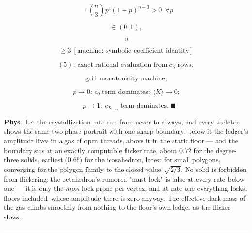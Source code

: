 \begin{theorem}
\[
= \binom n3p^4(1-p)^{n-3}>0\ \ \forall p
\]

\[
\in (0,1),
\]

\[
\ n
\]

\[
\ge 3\ [\text{machine: symbolic coefficient identity}]
\]

\[
(5):\ \text{exact rational evaluation from}\ c_K\ \text{rows};
\]

\[
\ \text{grid monotonicity machine};
\]

\[
\ p\to0:\ c_0\ \text{term dominates}:\ \langle K\rangle\to0;
\]

\[
\quad p\to1:\ c_{K_{\max}}\ \text{term dominates}.\ \blacksquare
\]

\textbf{Phys.} Let the crystallization rate run from never to always, and every skeleton shows the same two-phase portrait with one sharp boundary: below it the ledger's amplitude lives in a gas of open threads, above it in the static floor — and the boundary sits at an exactly computable flicker rate, about $0.72$ for the degree-three solids, earliest ($0.65$) for the icosahedron, latest for small polygons, converging for the polygon family to the closed value $\sqrt{2/3}$. No solid is forbidden from flickering: the octahedron's rumored "must lock" is false at every rate below one — it is only the \textit{most} lock-prone per vertex, and at rate one everything locks, floors included, whose amplitude there is zero anyway. The effective dark mass of the gas climbs smoothly from nothing to the floor's own ledger as the flicker slows.

\vspace{2pt}\noindent\rule{\textwidth}{0.4pt}\vspace{2pt}

\end{theorem}

